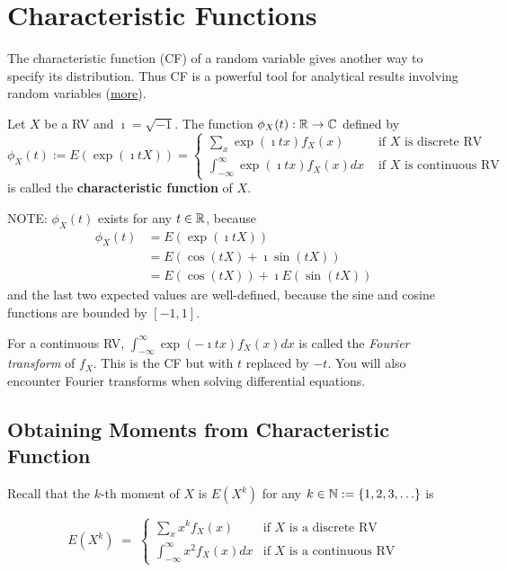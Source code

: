 \section{Characteristic Functions}
The characteristic function (CF) of a random variable gives another way to specify its distribution. 
Thus CF is a powerful tool for analytical results involving random variables
(\href{http://en.wikipedia.org/wiki/Characteristic_function_(probability_theory)}{more}).

\begin{definition}
Let $X$ be a RV and $\imath=\sqrt{-1}$. The function $\phi_X(t) : \mathbb{R} \to \mathbb{C}$ defined by
\begin{equation}\label{E:CF}
\boxed{
\phi_X(t) := E \left( \exp \left( \imath t X\right) \right) = 
\begin{cases}
\sum_{x} \exp \left( \imath t x\right) f_X(x) & \text{ if $X$ is discrete RV}\\
\int_{-\infty}^{\infty} \exp \left( \imath t x\right) f_X(x) dx & \text{ if $X$ is continuous RV}
\end{cases}
}
\end{equation}
is called the {\bf characteristic function} of $X$.
\end{definition}

NOTE: 
$\phi_X(t)$ exists for any $t \in \mathbb{R}$, because
\begin{align*}
\phi_X(t) 
&= E \left( \exp \left( \imath t X\right) \right) \\
&= E \left( \cos(tX)+ \imath \sin(tX) \right)\\
&= E \left( \cos(tX) \right) + \imath E \left(\sin(tX) \right)
\end{align*}
and the last two expected values are well-defined, because the sine and cosine functions are bounded by $[-1,1]$.

For a continuous RV, $\int_{-\infty}^{\infty} \exp \left(- \imath t x\right) f_X(x) dx$ is called the {\em Fourier transform} of $f_X$.  
This is the CF but with $t$ replaced by $-t$.  
You will also encounter Fourier transforms when solving differential equations.


\subsection{Obtaining Moments from Characteristic Function}

Recall that the $k$-th moment of $X$ is $E(X^k)$ for any $k \in \mathbb{N}:=\{1,2,3,\ldots\}$ is
\begin{framed}
\[
E(X^k)\; =\;
\begin{cases}
\displaystyle \sum_x x^k f_X(x) & \text{if $X$ is a discrete RV}\\[12pt]
\displaystyle \int_{-\infty}^{\infty} x^2 f_X(x) dx & \text{if $X$ is a continuous RV}
\end{cases}
\]
\end{framed}

